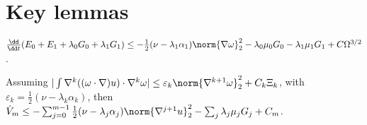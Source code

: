 \section{Key lemmas}
\begin{lemma}
$\frac{\dd}{\dd t}(E_0+E_1+\lambda_0 G_0+\lambda_1 G_1)
\le -\tfrac12(\nu-\lambda_1\alpha_1)\norm{\nabla\omega}_2^2 - \lambda_0\mu_0 G_0 - \lambda_1\mu_1 G_1 + C \Omega^{3/2}$.
\end{lemma}
\begin{lemma}
Assuming $| \int \nabla^k((\omega\cdot\nabla)u)\cdot \nabla^k\omega| \le \varepsilon_k \norm{\nabla^{k+1}\omega}_2^2 + C_k \Xi_k$, with $\varepsilon_k=\tfrac12(\nu-\lambda_k\alpha_k)$, then $\dot V_m \le -\sum_{j=0}^{m-1}\tfrac12(\nu-\lambda_j\alpha_j)\norm{\nabla^{j+1}u}_2^2 - \sum_j \lambda_j\mu_j G_j + C_m$.
\end{lemma}
